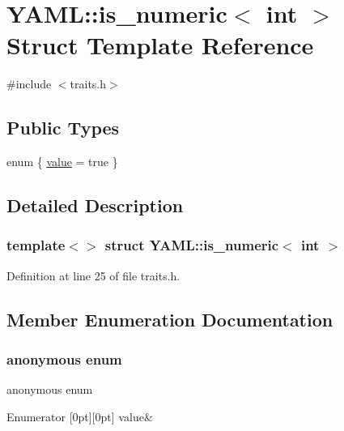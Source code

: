 \hypertarget{struct_y_a_m_l_1_1is__numeric_3_01int_01_4}{}\section{Y\+A\+ML\+::is\+\_\+numeric$<$ int $>$ Struct Template Reference}
\label{struct_y_a_m_l_1_1is__numeric_3_01int_01_4}


{\ttfamily \#include $<$traits.\+h$>$}

\subsection*{Public Types}
\begin{DoxyCompactItemize}
\item 
enum \{ \mbox{\hyperlink{struct_y_a_m_l_1_1is__numeric_3_01int_01_4_a09239e418f453b0214ec97c6f8e25d10a7aa590fdda6c43d01ff9ea40d1e5391b}{value}} = true
 \}
\end{DoxyCompactItemize}


\subsection{Detailed Description}
\subsubsection*{template$<$$>$\newline
struct Y\+A\+M\+L\+::is\+\_\+numeric$<$ int $>$}



Definition at line 25 of file traits.\+h.



\subsection{Member Enumeration Documentation}
\mbox{\label{struct_y_a_m_l_1_1is__numeric_3_01int_01_4_a09239e418f453b0214ec97c6f8e25d10}} 
\subsubsection{\texorpdfstring{anonymous enum}{anonymous enum}}
{\footnotesize\ttfamily anonymous enum}

\begin{DoxyEnumFields}{Enumerator}
[0pt][0pt]{}\mbox{\label{struct_y_a_m_l_1_1is__numeric_3_01int_01_4_a09239e418f453b0214ec97c6f8e25d10a7aa590fdda6c43d01ff9ea40d1e5391b}} 
value&\\
\hline

\end{DoxyEnumFields}


